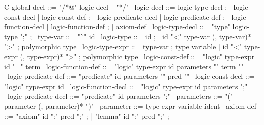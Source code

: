 \begin{syntax}
  C-global-decl ::= "/*@" logic-decl+ "*/"
  \
  logic-decl ::= logic-type-decl ;
          | logic-const-decl | logic-const-def ;
          | logic-predicate-decl | logic-predicate-def ;
          | logic-function-decl | logic-function-def ;
          | axiom-def
  \
  logic-type-decl ::= "type" logic-type ";" ;
  \
  type-var ::= "`" id
  \
  logic-type ::= id ;
  | id "<" type-var (, type-var)* ">" ; polymorphic type
  \
  logic-type-expr ::= type-var ; type variable
  | id "<" type-expr (, type-expr)* ">" ; polymorphic type
  \
  logic-const-def ::= "logic" type-expr id "=" term
  \
  logic-function-def ::= "logic" type-expr id parameters "{" term "}"
  \
  logic-predicate-def ::= "predicate" id parameters "{" pred "}"
  \
  logic-const-decl ::= "logic" type-expr id
  \
  logic-function-decl ::= "logic" type-expr id parameters ";"
  \
  logic-predicate-decl ::= "predicate" id parameters ";"
  \
  parameters ::= "(" parameter (, parameter)* ")"
  \
  parameter ::= type-expr variable-ident
  \
  axiom-def ::= "axiom" id ":" pred ";" ;
  | "lemma" id ":" pred ";" ;
\end{syntax}